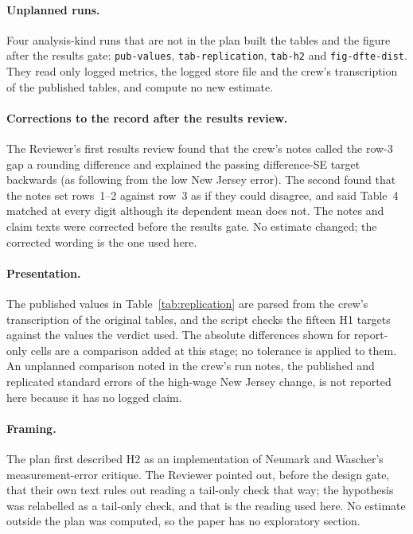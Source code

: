 \documentclass[11pt]{article}
\begin{document}
\paragraph{Unplanned runs.} Four analysis-kind runs that are not in the plan built the
tables and the figure after the results gate: \texttt{pub-values}, \texttt{tab-replication},
\texttt{tab-h2} and \texttt{fig-dfte-dist}. They read only logged metrics, the logged
store file and the crew's transcription of the published tables, and compute no new
estimate.

\paragraph{Corrections to the record after the results review.} The Reviewer's first results
review found that the crew's notes called the row-3 gap a rounding difference and explained
the passing difference-SE target backwards (as following from the low New Jersey error). The
second found that the notes set rows~1--2 against row~3 as if they could disagree, and said
Table~4 matched at every digit although its dependent mean does not. The notes and claim
texts were corrected before the results gate. No estimate changed; the corrected wording is
the one used here.

\paragraph{Presentation.} The published values in
Table~\ref{tab:replication} are parsed from the crew's transcription of the original tables,
and the script checks the fifteen H1 targets against the values the verdict used. The
absolute differences shown for report-only cells are a comparison added at this stage; no
tolerance is applied to them. An unplanned comparison noted in the crew's run notes, the
published and replicated standard errors of the high-wage New Jersey change, is not reported
here because it has no logged claim.

\paragraph{Framing.} The plan first described H2 as an implementation of Neumark and
Wascher's measurement-error critique. The Reviewer pointed out, before the design gate, that
their own text rules out reading a tail-only check that way; the hypothesis was relabelled as
a tail-only check, and that is the reading used here. No estimate outside the plan was
computed, so the paper has no exploratory section.
\end{document}
